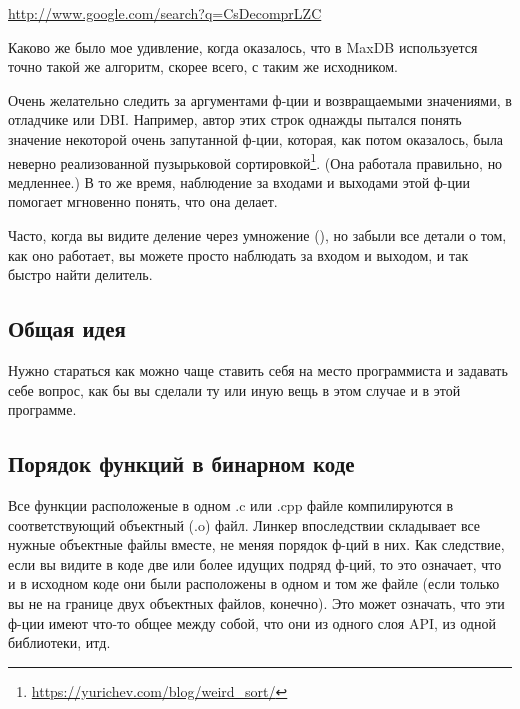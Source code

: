 \url{http://www.google.com/search?q=CsDecomprLZC}

Каково же было мое удивление, когда оказалось, что в MaxDB используется точно такой же алгоритм, 
скорее всего, с таким же исходником.



Очень желательно следить за аргументами ф-ции и возвращаемыми значениями, в отладчике или \ac{DBI}.
Например, автор этих строк однажды пытался понять значение некоторой очень запутанной ф-ции, которая, как потом оказалось,
была неверно реализованной пузырьковой сортировкой\footnote{\url{https://yurichev.com/blog/weird_sort/}}.
(Она работала правильно, но медленнее.)
В то же время, наблюдение за входами и выходами этой ф-ции помогает мгновенно понять, что она делает.

Часто, когда вы видите деление через умножение (),
но забыли все детали о том, как оно работает, вы можете просто наблюдать за входом и выходом, и так быстро найти делитель.














\subsection{Общая идея}

Нужно стараться как можно чаще ставить себя на место программиста и задавать себе вопрос, 
как бы вы сделали ту или иную вещь в этом случае и в этой программе.

\subsection{Порядок функций в бинарном коде}

Все функции расположеные в одном .c или .cpp файле компилируются в соответствующий объектный (.o) файл.
Линкер впоследствии складывает все нужные объектные файлы вместе, не меняя порядок ф-ций в них.
Как следствие, если вы видите в коде две или более идущих подряд ф-ций, то это означает, что и в исходном коде они 
были расположены в одном и том же файле (если только вы не на границе двух объектных файлов, конечно).
Это может означать, что эти ф-ции имеют что-то общее между собой, что они из одного слоя \ac{API}, из одной библиотеки, итд.%

